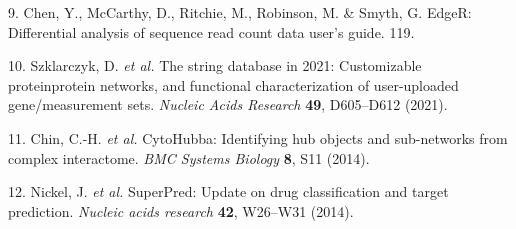 \documentclass[
]{article}
\newenvironment{cslreferences}%
  {}%
  {\par}
\begin{document}
\begin{cslreferences}
\leavevmode\hypertarget{ref-EdgerDifferenChen}{}%
9. Chen, Y., McCarthy, D., Ritchie, M., Robinson, M. \& Smyth, G. EdgeR: Differential analysis of sequence read count data user's guide. 119.

\leavevmode\hypertarget{ref-TheStringDataSzklar2021}{}%
10. Szklarczyk, D. \emph{et al.} The string database in 2021: Customizable proteinprotein networks, and functional characterization of user-uploaded gene/measurement sets. \emph{Nucleic Acids Research} \textbf{49}, D605--D612 (2021).

\leavevmode\hypertarget{ref-CytohubbaIdenChin2014}{}%
11. Chin, C.-H. \emph{et al.} CytoHubba: Identifying hub objects and sub-networks from complex interactome. \emph{BMC Systems Biology} \textbf{8}, S11 (2014).

\leavevmode\hypertarget{ref-SuperpredUpdaNickel2014}{}%
12. Nickel, J. \emph{et al.} SuperPred: Update on drug classification and target prediction. \emph{Nucleic acids research} \textbf{42}, W26--W31 (2014).
\end{cslreferences}
\end{document}

